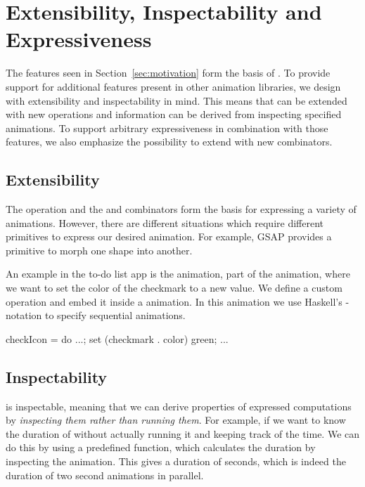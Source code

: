 \section{Extensibility, Inspectability and Expressiveness}
\label{sec:features}

The features seen in Section~\ref{sec:motivation} form the basis of \dsl{}.
To provide support for additional features present in other animation libraries,
we design \dsl{} with extensibility and
inspectability in mind. This means that \dsl{} can be extended with new
operations and information can be derived from inspecting specified animations.
To support arbitrary expressiveness in combination with those
features, we also emphasize the possibility to extend \dsl{} with new
combinators.

\subsection{Extensibility}
\label{sec:customop}

The  operation and the  and  combinators form the basis for expressing a variety of animations. However, there are different situations which require different primitives to express our desired animation. For example, GSAP provides a primitive to morph one shape into another.

An example in the to-do list app is the  animation, part of the  animation, where we want to set the color of the checkmark to a new value. We define a custom  operation and embed it inside a \dsl{} animation. In this animation we use Haskell's -notation to specify sequential animations.

\begin{spec}
checkIcon = do ...; set (checkmark . color) green; ...
\end{spec}


\subsection{Inspectability}

\dsl{} is inspectable, meaning that we can derive properties of expressed computations by \emph{inspecting them rather than running them}. For example, if we want to know the duration of  without actually running it and keeping track of the time. We can do this by using a predefined  function, which calculates the duration by inspecting the animation. This gives a duration of  seconds, which is indeed the duration of two  second animations in parallel.

